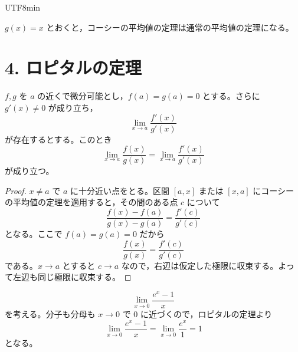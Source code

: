 \documentclass[a4paper,12pt]{article}
\begin{document}
\begin{CJK}{UTF8}{min}
\begin{remark}
$g(x)=x$ とおくと，コーシーの平均値の定理は通常の平均値の定理になる。
\end{remark}

\section*{4. ロピタルの定理}

\begin{theorem}
$f,g$ を $a$ の近くで微分可能とし，$f(a)=g(a)=0$ とする。さらに $g'(x)\neq 0$ が成り立ち，
\[
\lim_{x\to a}\frac{f'(x)}{g'(x)}
\]
が存在するとする。このとき
\[
\lim_{x\to a}\frac{f(x)}{g(x)}
=\lim_{x\to a}\frac{f'(x)}{g'(x)}
\]
が成り立つ。
\end{theorem}

\begin{proof}
$x\neq a$ で $a$ に十分近い点をとる。区間 $[a,x]$ または $[x,a]$ にコーシーの平均値の定理を適用すると，その間のある点 $c$ について
\[
\frac{f(x)-f(a)}{g(x)-g(a)}=\frac{f'(c)}{g'(c)}
\]
となる。ここで $f(a)=g(a)=0$ だから
\[
\frac{f(x)}{g(x)}=\frac{f'(c)}{g'(c)}
\]
である。$x\to a$ とすると $c\to a$ なので，右辺は仮定した極限に収束する。よって左辺も同じ極限に収束する。
\end{proof}

\begin{example}
\[
\lim_{x\to 0}\frac{e^x-1}{x}
\]
を考える。分子も分母も $x\to 0$ で $0$ に近づくので，ロピタルの定理より
\[
\lim_{x\to 0}\frac{e^x-1}{x}
=\lim_{x\to 0}\frac{e^x}{1}=1
\]
となる。
\end{example}

\ifPDFTeX
\end{CJK}
\fi
\end{document}
